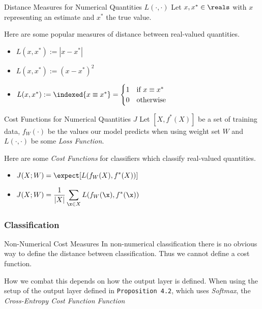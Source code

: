 \documentclass[11pt,a4paper]{article}
\begin{document}
  \begin{proposition}{Distance Measures for Numerical Quantities $L(\cdot,\cdot)$}
    Let $x,x^*\in\reals$ with $x$ representing an estimate and $x^*$ the true value.
    \par Here are some popular measures of distance between real-valued quantities.
    \begin{itemize}
      \item[\textit{Identity Distance}] $L(x,x^*):=|x-x^*|$
      \item[\textit{Absolute Distance}] $L(x,x^*):=(x-x^*)^2$
      \item[\textit{Quadratic Distance}] $L(x,x^*):=\indexed\{x\equiv x^*\}=\begin{cases}1&\text{if }x\equiv x^*\\0&\text{otherwise} \end{cases}$
    \end{itemize}
  \end{proposition}

  \begin{proposition}{Cost Functions for Numerical Quantities $J$}
    Let $[X,f^*(X)]$ be a set of training data, $f_W(\cdot)$ be the values our model predicts when using weight set $W$ and $L(\cdot,\cdot)$ be some \textit{Loss Function}.
    \par Here are some \textit{Cost Functions} for classifiers which classify real-valued quantities.
    \begin{itemize}
      \item[\textit{Expected Loss}] $\displaystyle J(X;W)=\expect[L(f_W(X),f^*(X))]$
      \item[\textit{Empirical Risk}] $\displaystyle J(X;W)=\frac1{|X|}\sum_{\x\in X}L(f_W(\x),f^*(\x))$
    \end{itemize}
  \end{proposition}

\subsubsection{Classification}

  \begin{remark}{Non-Numerical Cost Measures}
    In non-numerical classification there is no obvious way to define the distance between classification. Thus we cannot define a cost function.
    \par How we combat this depends on how the output layer is defined. When using the setup of the output layer defined in \texttt{Proposition 4.2}, which uses \textit{Softmax}, the \textit{Cross-Entropy Cost Function Function}
  \end{remark}
\end{document}
